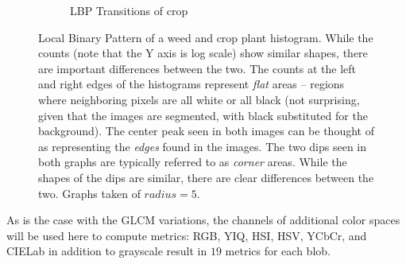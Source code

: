 \documentclass[letterpaper]{report}
\begin{document}
\begin{figure}[H]
\begin{subfigure}{0.48\linewidth}
		\caption{LBP Transitions of crop}
		\label{subfig:lbp-crop}		
	\end{subfigure}%
	\caption[Local Binary Pattern of a weed and crop plant histogram]{Local Binary Pattern of a weed and crop plant histogram. While the counts (note that the Y axis is log scale) show similar shapes, there are important differences between the two. The counts at the left and right edges of the histograms represent \textit{flat} areas -- regions where neighboring pixels are all white or all black (not surprising, given that the images are segmented, with black substituted for the background). The center peak seen in both images can be thought of as representing the \textit{edges} found in the images. The two dips seen in both graphs are typically referred to as \textit{corner} areas. While the shapes of the dips are similar, there are clear differences between the two. Graphs taken of $radius=5$.}
	\label{fig:lbp}
\end{figure}

As is the case with the GLCM variations, the channels of additional color spaces will be used here to compute metrics: RGB, YIQ, HSI, HSV, YCbCr, and CIELab in addition to grayscale result in $19$ metrics for each blob.
\end{document}
